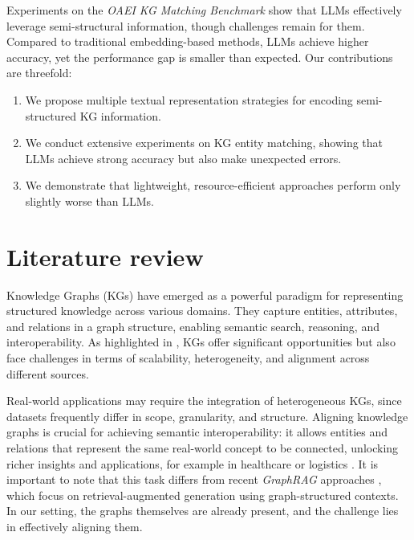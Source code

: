 \documentclass[11pt]{article}
\begin{document}
Experiments on the \emph{OAEI KG Matching Benchmark } \cite{oaei_kgtrack} show that LLMs effectively leverage semi-structural information, though challenges remain for them. Compared to traditional embedding-based methods, LLMs achieve higher accuracy, yet the performance gap is smaller than expected. Our contributions are threefold:

\begin{enumerate}[nosep]
    \setlength\itemsep{0em}
    \setlength\parskip{0em}
    \setlength\parsep{0em}
    \item We propose multiple textual representation strategies for encoding semi-structured KG information.
    \item We conduct extensive experiments on KG entity matching, showing that LLMs achieve strong accuracy but also make unexpected errors.
    \item We demonstrate that lightweight, resource-efficient approaches perform only slightly worse than LLMs.
\end{enumerate}

\section{Literature review}

Knowledge Graphs (KGs) have emerged as a powerful paradigm for representing structured knowledge across various domains. They capture entities, attributes, and relations in a graph structure, enabling semantic search, reasoning, and interoperability. As highlighted in \citet{kg_opportunities}, KGs offer significant opportunities but also face challenges in terms of scalability, heterogeneity, and alignment across different sources.

Real-world applications may require the integration of heterogeneous KGs, since datasets frequently differ in scope, granularity, and structure. Aligning knowledge graphs is crucial for achieving semantic interoperability: it allows entities and relations that represent the same real-world concept to be connected, unlocking richer insights and applications, for example in healthcare \cite{hl7_fhir, personalized_medicine} or logistics \cite{logistics_alignment}. It is important to note that this task differs from recent \emph{GraphRAG} approaches \cite{graphrag}, which focus on retrieval-augmented generation using graph-structured contexts. In our setting, the graphs themselves are already present, and the challenge lies in effectively aligning them.
\end{document}
